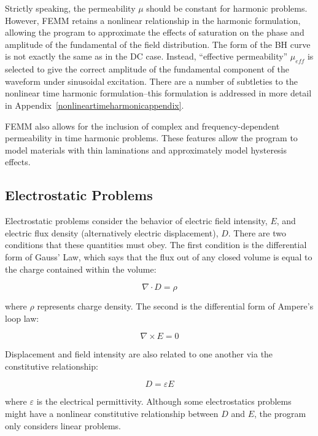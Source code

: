 \documentclass[12pt]{report}
\begin{document}
Strictly speaking, the permeability $\mu$ should be constant for
harmonic problems. However, FEMM retains a nonlinear relationship
in the harmonic formulation, allowing the program to approximate
the effects of saturation on the phase and amplitude of the
fundamental of the field distribution. The form of the BH curve is
not exactly the same as in the DC case. Instead, ``effective
permeability'' $\mu_{eff}$ is selected to give the correct
amplitude of the fundamental component of the waveform under
sinusoidal excitation. There are a number of subtleties to the
nonlinear time harmonic formulation--this formulation is addressed
in more detail in Appendix~\ref{nonlineartimeharmonicappendix}.

FEMM also allows for the inclusion of complex and frequency-dependent permeability in time harmonic problems.
These features allow the program to model materials with thin laminations and approximately model hysteresis
effects.

\subsection{Electrostatic Problems}

Electrostatic problems consider the behavior of electric field
intensity, $E$, and electric flux density (alternatively electric
displacement), $D$. There are two conditions that these quantities
must obey. The first condition is the differential form of Gauss'
Law, which says that the flux out of any closed volume is equal to
the charge contained within the volume:

\begin{equation}
\label{eq1}
\nabla \cdot D = \rho
\end{equation}

\noindent
where \textit{$\rho $} represents charge density. The second is the
differential form of Ampere's loop law:

\begin{equation}
\label{eq2}
\nabla \times E = 0
\end{equation}

\noindent
Displacement and field intensity are also related to one another via the
constitutive relationship:

\begin{equation}
\label{eq3}
D = \varepsilon E
\end{equation}

\noindent
where \textit{$\varepsilon $} is the electrical permittivity. Although some electrostatics problems
might have a nonlinear constitutive relationship between $D$ and $E$, the program only
considers linear problems.
\end{document}
